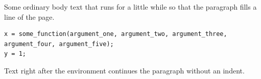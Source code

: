 \documentclass{article}
\begin{document}
Some ordinary body text that runs for a little while so that the paragraph fills a line of the page.
\begin{lstlisting}[basicstyle=\ttfamily,breaklines=true]
x = some_function(argument_one, argument_two, argument_three, argument_four, argument_five);
y = 1;
\end{lstlisting}
Text right after the environment continues the paragraph without an indent.
\end{document}

